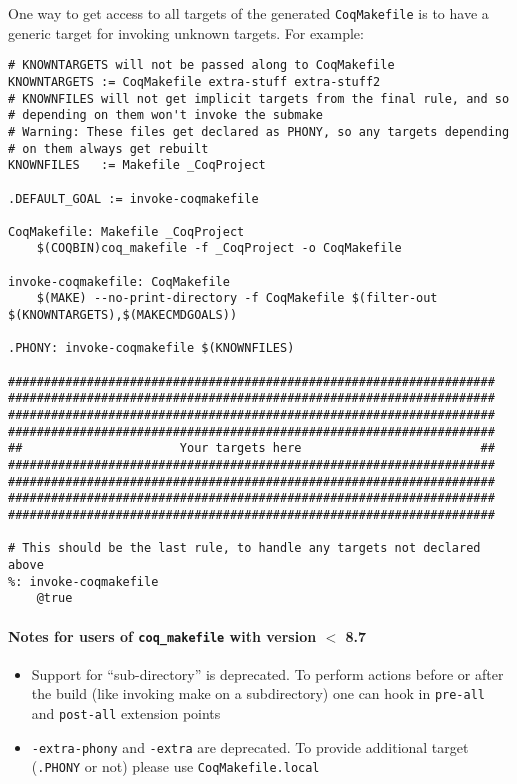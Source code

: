 One way to get access to all targets of the generated
\texttt{CoqMakefile} is to have a generic target for invoking unknown
targets.  For example:
\begin{verbatim}
# KNOWNTARGETS will not be passed along to CoqMakefile
KNOWNTARGETS := CoqMakefile extra-stuff extra-stuff2
# KNOWNFILES will not get implicit targets from the final rule, and so
# depending on them won't invoke the submake
# Warning: These files get declared as PHONY, so any targets depending
# on them always get rebuilt
KNOWNFILES   := Makefile _CoqProject

.DEFAULT_GOAL := invoke-coqmakefile

CoqMakefile: Makefile _CoqProject
	$(COQBIN)coq_makefile -f _CoqProject -o CoqMakefile

invoke-coqmakefile: CoqMakefile
	$(MAKE) --no-print-directory -f CoqMakefile $(filter-out $(KNOWNTARGETS),$(MAKECMDGOALS))

.PHONY: invoke-coqmakefile $(KNOWNFILES)

####################################################################
####################################################################
####################################################################
####################################################################
##                      Your targets here                         ##
####################################################################
####################################################################
####################################################################
####################################################################

# This should be the last rule, to handle any targets not declared above
%: invoke-coqmakefile
	@true
\end{verbatim}

\paragraph{Notes for users of {\tt coq\_makefile} with version $<$ 8.7}

\begin{itemize}
\item Support for ``sub-directory'' is deprecated.  To perform actions before
	or after the build (like invoking make on a subdirectory) one can
	hook in {\tt pre-all} and {\tt post-all} extension points
\item \texttt{-extra-phony} and \texttt{-extra} are deprecated.  To provide
	additional target ({\tt .PHONY} or not) please use 
	{\tt CoqMakefile.local}
\end{itemize}

